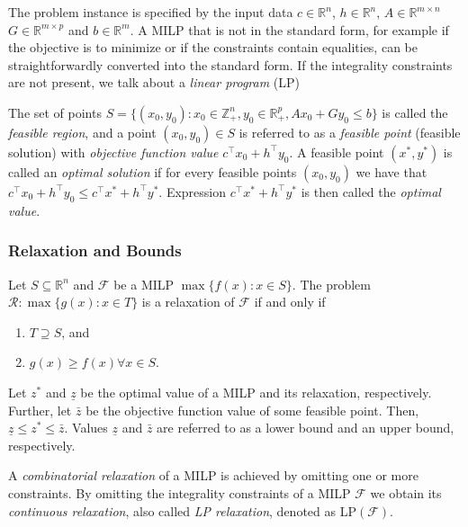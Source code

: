 The problem instance is specified by the input data $c\in \mathbb{R}^n$, $h \in \mathbb{R}^n$, $A \in \mathbb{R}^{m\times n}$  $G \in\mathbb{R}^{m\times p}$ and $b \in \mathbb{R}^m$.
A MILP that is not in the standard form, for example if the objective is to minimize or if the constraints contain equalities, can be straightforwardly converted into the standard form.
If the integrality constraints are not present, we talk about a \emph{linear program} (LP)


The set of points $S=\{(x_0,y_0):  x_0 \in \mathbb{Z}^{n}_+, y_0  \in\mathbb{R}^{p}_+, Ax_0 + Gy_0 \leq b\}$ is called the \emph{feasible region},  
and a point $(x_0,y_0)\in S$ is referred to as a \emph{feasible point} (feasible solution) with \emph{objective function value} $c^\top x_0 + h^\top y_0$. 
A feasible point $(x^*,y^*)$ is called an \emph{optimal solution} if for every feasible points $(x_0,y_0)$ we have that $c^\top x_0 + h^\top y_0 \leq c^\top x^* + h^\top y^*$. 
Expression $c^\top x^* + h^\top y^*$ is then called the \emph{optimal value}. 

\subsubsection{Relaxation and Bounds}

\begin{definition}
	Let $S\subseteq \mathbb{R}^n$ and $\mathcal{F}$ be a MILP $\max\{f(x):x\in S\}$.
	The problem $\mathcal{R}: \max\{g(x):x\in T\}$ is a relaxation of $\mathcal{F}$ if and only if
	\begin{enumerate}
		\item $T\supseteq S$, and
		\item $g(x)\geq f(x) \forall x\in S$.
	\end{enumerate}
\end{definition}


Let $z^*$ and $\underline{z}$ be the optimal value of a MILP and its relaxation, respectively. 
Further, let $\bar{z}$ be the objective function value of some feasible point.
Then, $\underline{z}\leq z^* \leq \bar{z}$.
Values $\underline{z}$ and $\bar{z}$ are referred to as a lower bound and an upper bound, respectively.

A \emph{combinatorial relaxation} of a MILP is achieved by omitting one or more constraints. 
By omitting the integrality constraints of a MILP $\mathcal{F}$ we obtain its \emph{continuous relaxation}, also called \emph{LP relaxation}, denoted as LP$(\mathcal{F})$.

